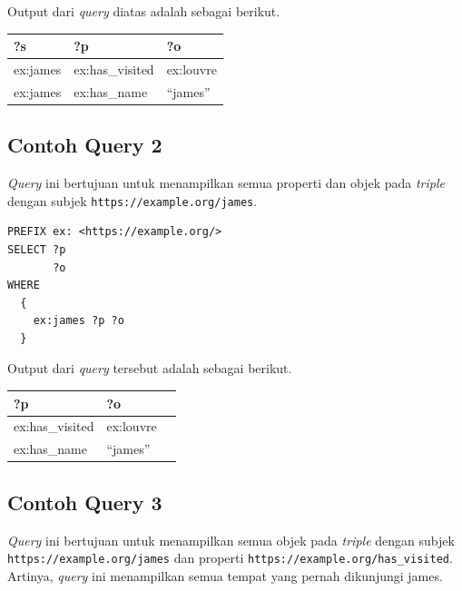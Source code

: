 Output dari \textit{query} diatas adalah sebagai berikut.

\begin{longtable}{|l|l|l|} \hline
  ?s       & ?p              & ?o        \\\hline \endhead
  ex:james & ex:has\_visited & ex:louvre \\\hline
  ex:james & ex:has\_name    & ``james'' \\\hline
\end{longtable}

\subsection{Contoh Query 2}\label{contoh-query-2}

\textit{Query} ini bertujuan untuk menampilkan semua properti dan objek pada \textit{triple} dengan
subjek \texttt{https://example.org/james}.

\begin{verbatim}
PREFIX ex: <https://example.org/>
SELECT ?p
       ?o
WHERE
  {
    ex:james ?p ?o
  }
  \end{verbatim}

Output dari \textit{query} tersebut adalah sebagai berikut.

\begin{longtable}{|l|l|l|} \hline
  ?p              & ?o        \\\hline \endhead
  ex:has\_visited & ex:louvre \\\hline
  ex:has\_name    & ``james'' \\\hline
\end{longtable}

\subsection{Contoh Query 3}\label{contoh-query-3}

\textit{Query} ini bertujuan untuk menampilkan semua objek pada \textit{triple} dengan subjek
\texttt{https://example.org/james} dan properti \texttt{https://example.org/has\_visited}. Artinya,
\textit{query} ini menampilkan semua tempat yang pernah dikunjungi james.

